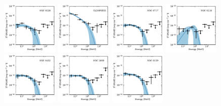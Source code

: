 \documentclass[doublespace,draft,nopageskip]{VTthesis} %
\begin{document}
\begin{appendices}
\begin{figure}
\includegraphics[width=0.24\textwidth]{Figures/Globular/spectra/PLE_spectrum_20.pdf}
\includegraphics[width=0.24\textwidth]{Figures/Globular/spectra/PLE_spectrum_2.pdf}
\includegraphics[width=0.24\textwidth]{Figures/Globular/spectra/PLE_spectrum_23.pdf}
\includegraphics[width=0.24\textwidth]{Figures/Globular/spectra/PLE_spectrum_10.pdf}
\includegraphics[width=0.24\textwidth]{Figures/Globular/spectra/PLE_spectrum_17.pdf}
\includegraphics[width=0.24\textwidth]{Figures/Globular/spectra/PLE_spectrum_5.pdf}
\includegraphics[width=0.24\textwidth]{Figures/Globular/spectra/PLE_spectrum_9.pdf}

\end{figure}
\end{appendices}
\end{document}
